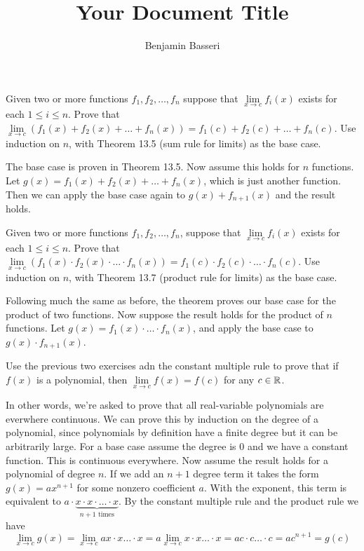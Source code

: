 \documentclass{article}
\title{Your Document Title}
\author{Benjamin Basseri}
\begin{document}
\maketitle
\begin{problem}
Given two or more functions $f_1, f_2, \ldots, f_n$ suppose that $\lim\limits_{x\to c} f_i(x) $ exists for each $1 \leq i \leq n$. Prove that $\lim\limits_{x\to c} (f_1(x) + f_2(x) + \ldots + f_n(x)) = f_1(c) + f_2(c) + \ldots + f_n(c)$. Use induction on $n$, with Theorem 13.5 (sum rule for limits) as the base case.
\end{problem}

The base case is proven in Theorem 13.5. Now assume this holds for $n$ functions. Let $g(x) = f_1(x) + f_2(x) + \ldots + f_n(x)$, which is just another function. Then we can apply the base case again to $g(x) + f_{n+1}(x)$ and the result holds.

\begin{problem}
Given two or more functions $f_1, f_2, \ldots, f_n$, suppose that $\lim\limits_{x \to c}f_i(x)$ exists for each $1 \leq i \leq n$. Prove that $\lim\limits_{x \to c} (f_1(x) \cdot f_2(x) \cdot \ldots \cdot f_n(x)) = f_1(c) \cdot f_2(c) \cdot \ldots \cdot f_n(c)$. Use induction on $n$, with Theorem 13.7 (product rule for limits) as the base case.
\end{problem}

Following much the same as before, the theorem proves our base case for the product of two functions. Now suppose the result holds for the product of $n$ functions. Let $g(x) = f_1(x)\cdot \ldots \cdot f_n(x)$, and apply the base case to $g(x) \cdot f_{n+1}(x)$.

\begin{problem}
Use the previous two exercises adn the constant multiple rule to prove that if $f(x)$ is a polynomial, then $\lim\limits_{x \to c} f(x) = f(c)$ for any $c \in \mathbb{R}$.
\end{problem}

In other words, we're asked to prove that all real-variable polynomials are everwhere continuous. We can prove this by induction on the degree of a polynomial, since polynomials by definition have a finite degree but it can be arbitrarily large. For a base case assume the degree is 0 and we have a constant function. This is continuous everywhere. Now assume the result holds for a polynomial of degree $n$. If we add an $n+1$ degree term it takes the form $g(x) = ax^{n+1}$ for some nonzero coefficient $a$. With the exponent, this term is equivalent to $a\cdot \underbrace{x \cdot x \cdot \ldots \cdot x}_{\text{$n + 1$ times}}$. By the constant multiple rule and the product rule we have
$$\lim_{x \to c} g(x) = \lim_{x \to c} a x \cdot x \ldots \cdot x = a \lim_{x \to c} x \cdot x \ldots \cdot x = a c \cdot c \ldots \cdot c = a c^{n+1} = g(c)$$
\end{document}
